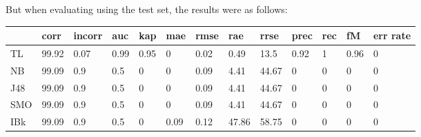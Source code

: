 \documentclass[a4paper,12pt, english]{article}
\begin{document}
But when evaluating using the test set, the results were as follows:
\begin{small}
\begin{center}
    \begin{tabular}{ | l | l | l | l | l | l | l | l | l | l | l | l | l |}
    \hline
      	& corr & incorr  & auc & kap & mae & rmse & rae & rrse & prec & rec & fM & err rate\\ \hline
      	TL & 99.92 & 0.07 & 0.99 & 0.95 & 0 & 0.02 & 0.49 & 13.5 & 0.92 & 1 & 0.96 & 0\\ \hline
	NB & 99.09 & 0.9 & 0.5 & 0 & 0 & 0.09 & 4.41 & 44.67 & 0 & 0 & 0 & 0\\ \hline
	J48 & 99.09 & 0.9 & 0.5 & 0 & 0 & 0.09 & 4.41 & 44.67 & 0 & 0 & 0 & 0\\ \hline
	SMO & 99.09 & 0.9 & 0.5 & 0 & 0 & 0.09 & 4.41 & 44.67 & 0 & 0 & 0 & 0\\ \hline
	IBk & 99.09 & 0.9 & 0.5 & 0 & 0.09 & 0.12 & 47.86 & 58.75 & 0 & 0 & 0 & 0\\ \hline  
    \end{tabular}       
\end{center}
\end{small}

\newpage
\end{document}
